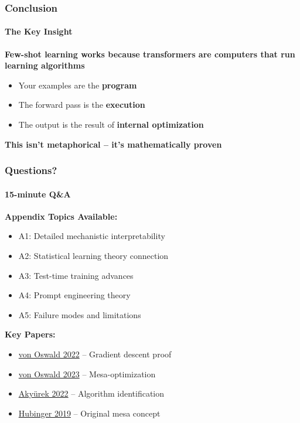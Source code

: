 \documentclass[10pt,aspectratio=169]{beamer}
\begin{document}
\begin{frame}
\frametitle{Conclusion}
\framesubtitle{The Key Insight}

\begin{center}
\Large
\textbf{Few-shot learning works because transformers are computers that run learning algorithms}
\end{center}

\vspace{1cm}

\begin{itemize}
    \item Your examples are the \textbf{program}
    \item The forward pass is the \textbf{execution}
    \item The output is the result of \textbf{internal optimization}
\end{itemize}

\vspace{1cm}

\begin{center}
\textbf{This isn't metaphorical -- it's mathematically proven}
\end{center}
\end{frame}


\begin{frame}
\frametitle{Questions?}
\framesubtitle{15-minute Q\&A}

\Large
\textbf{Appendix Topics Available:}

\normalsize
\begin{itemize}
    \item A1: Detailed mechanistic interpretability
    \item A2: Statistical learning theory connection
    \item A3: Test-time training advances
    \item A4: Prompt engineering theory
    \item A5: Failure modes and limitations
\end{itemize}

\vspace{0.5cm}
\textbf{Key Papers:}
\begin{itemize}
    \item \href{run:./papers/2212.07677_transformers_gradient_descent.pdf}{\color{blue}von Oswald 2022} -- Gradient descent proof
    \item \href{run:./papers/2309.05858_mesa_optimization.pdf}{\color{blue}von Oswald 2023} -- Mesa-optimization
    \item \href{run:./papers/2211.15661_learning_algorithm.pdf}{\color{blue}Akyürek 2022} -- Algorithm identification
    \item \href{run:./papers/1906.01820_risks_learned_optimization.pdf}{\color{blue}Hubinger 2019} -- Original mesa concept
\end{itemize}
\end{frame}
\end{document}

